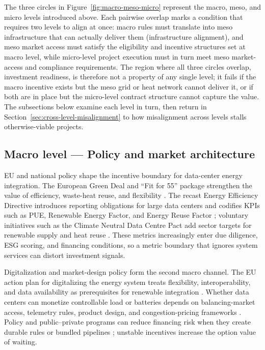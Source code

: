 \documentclass[preprint,12pt]{elsarticle}
\begin{document}
The three circles in Figure~\ref{fig:macro-meso-micro} represent the macro, meso, and micro levels introduced above. Each pairwise overlap marks a condition that requires two levels to align at once: macro rules must translate into meso infrastructure that can actually deliver them (infrastructure alignment), and meso market access must satisfy the eligibility and incentive structures set at macro level, while micro-level project execution must in turn meet meso market-access and compliance requirements. The region where all three circles overlap, investment readiness, is therefore not a property of any single level; it fails if the macro incentive exists but the meso grid or heat network cannot deliver it, or if both are in place but the micro-level contract structure cannot capture the value. The subsections below examine each level in turn, then return in Section~\ref{sec:cross-level-misalignment} to how misalignment across levels stalls otherwise-viable projects.

\subsection{Macro level --- Policy and market architecture}
EU and national policy shape the incentive boundary for data-center energy integration. The European Green Deal and ``Fit for 55'' package strengthen the value of efficiency, waste-heat reuse, and flexibility \cite{17,7}. The recast Energy Efficiency Directive introduces reporting obligations for large data centers and codifies KPIs such as PUE, Renewable Energy Factor, and Energy Reuse Factor \cite{15,EUDataCenterDirective2023}; voluntary initiatives such as the Climate Neutral Data Centre Pact add sector targets for renewable supply and heat reuse \cite{16}. These metrics increasingly enter due diligence, ESG scoring, and financing conditions, so a metric boundary that ignores system services can distort investment signals.

Digitalization and market-design policy form the second macro channel. The EU action plan for digitalizing the energy system treats flexibility, interoperability, and data availability as prerequisites for renewable integration \cite{8}. Whether data centers can monetize controllable load or batteries depends on balancing-market access, telemetry rules, product design, and congestion-pricing frameworks \cite{12,13}. Policy and public--private programs can reduce financing risk when they create durable rules or bundled pipelines \cite{18,interregnorthseaBRAVEBuilding}; unstable incentives increase the option value of waiting.
\end{document}
